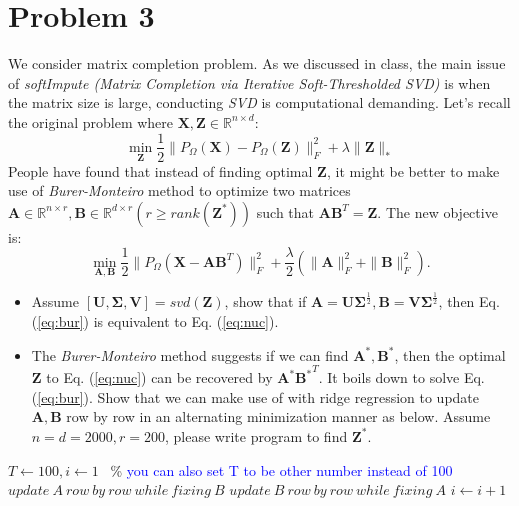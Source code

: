 \documentclass[11pt]{article}
\newcommand{\mtx}[1]{\mathbf{#1}}
\def \mA {\mtx{A}}
\def \mB {\mtx{B}}
\def \mU {\mtx{U}}
\def \mV {\mtx{V}}
\def \mSigma {\mtx{\Sigma}}
\def \mX {\mtx{X}}
\def \mZ {\mtx{Z}}
\begin{document}
	\section*{Problem 3}
	We consider matrix completion problem. As we discussed in class, the main issue of \textit{softImpute (Matrix Completion via Iterative Soft-Thresholded SVD)} is when the matrix size is large, conducting \textit{SVD} is computational demanding. Let's recall the original problem where $\mX, \mZ \in\mathbb{R}^{n\times d}$: 
	\begin{equation}\label{eq:nuc}
	\min\limits_{\mZ}\frac{1}{2}\|P_\Omega(\mX)-P_\Omega(\mZ)\|_F^2+\lambda \|\mZ\|_*
	\end{equation} 
People have found that instead of finding optimal $\mZ$, it might be better to make use of \textit{Burer-Monteiro} method to optimize two matrices $\mA \in\mathbb{R}^{n\times r}, \mB\in\mathbb{R}^{d\times r} (r\ge rank(\mZ^*))$ such that $\mA\mB^T=\mZ$. The new objective is:
	\begin{equation}\label{eq:bur}
	\min\limits_{\mA,\mB}\frac{1}{2}\|P_\Omega(\mX-\mA\mB^T)\|_F^2+\frac{\lambda}{2}(\|\mA\|_F^2+\|\mB\|^2_F).
\end{equation} 
\begin{itemize}
	\item Assume $[\mU,\mSigma,\mV]=svd(\mZ)$, show that if $\mA=\mU\mSigma^\frac{1}{2}, \mB=\mV\mSigma^\frac{1}{2}$, then Eq. (\ref{eq:bur}) is equivalent to Eq. (\ref{eq:nuc}).
	\item The \textit{Burer-Monteiro} method suggests if we can find  $\mA^*,\mB^*$, then the optimal $\mZ$ to Eq. (\ref{eq:nuc}) can be recovered by $\mA^*{\mB^*}^T$. It boils down to solve Eq. (\ref{eq:bur}). Show that we can make use of  with ridge regression to update $\mA, \mB$ row by row in an alternating minimization manner as below. Assume $n=d=2000, r=200$, please write program to find $\mZ^*$.
\end{itemize}
\begin{algorithmic}
	\State $T \gets 100, i\gets 1$ \ \% \textcolor{blue}{you can also set T to be other number instead of 100}
	\State $update \ A \ row \ by \ row \ while \ fixing \ B$
	\State $update \ B \ row \ by \ row \ while \ fixing \ A$
	\State $i \gets i+1$
	\EndIf 
\end{algorithmic}
\end{document}

